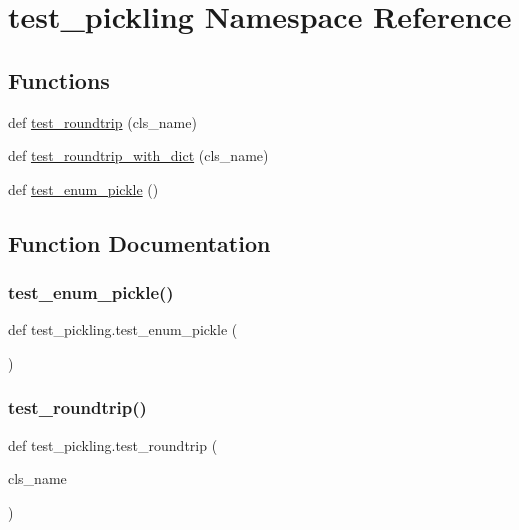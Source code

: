 \hypertarget{namespacetest__pickling}{}\section{test\+\_\+pickling Namespace Reference}
\label{namespacetest__pickling}
\subsection*{Functions}
\begin{DoxyCompactItemize}
\item 
def \mbox{\hyperlink{namespacetest__pickling_aa08d709cf67bc42bd1fc91bd3f232f65}{test\+\_\+roundtrip}} (cls\+\_\+name)
\item 
def \mbox{\hyperlink{namespacetest__pickling_a17fcaf9026bd594a3a0dae8266331873}{test\+\_\+roundtrip\+\_\+with\+\_\+dict}} (cls\+\_\+name)
\item 
def \mbox{\hyperlink{namespacetest__pickling_ae01fa8841ab63d9cd349ef9b780b3685}{test\+\_\+enum\+\_\+pickle}} ()
\end{DoxyCompactItemize}


\subsection{Function Documentation}
\mbox{\label{namespacetest__pickling_ae01fa8841ab63d9cd349ef9b780b3685}} 
\subsubsection{\texorpdfstring{test\_enum\_pickle()}{test\_enum\_pickle()}}
{\footnotesize\ttfamily def test\+\_\+pickling.\+test\+\_\+enum\+\_\+pickle (\begin{DoxyParamCaption}{ }\end{DoxyParamCaption})}

\mbox{\label{namespacetest__pickling_aa08d709cf67bc42bd1fc91bd3f232f65}} 
\subsubsection{\texorpdfstring{test\_roundtrip()}{test\_roundtrip()}}
{\footnotesize\ttfamily def test\+\_\+pickling.\+test\+\_\+roundtrip (\begin{DoxyParamCaption}\item[{}]{cls\+\_\+name }\end{DoxyParamCaption})}

